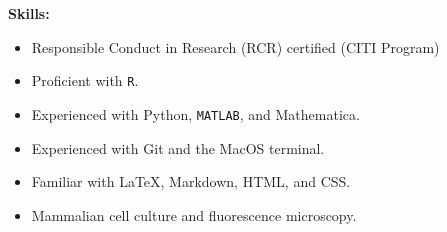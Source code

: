 \textbf{Skills:}

\begin{itemize}[noitemsep]
\item Responsible Conduct in Research (RCR) certified (CITI Program)
\item Proficient with \texttt{R}.
\item Experienced with Python, \texttt{MATLAB}, and Mathematica.
\item Experienced with Git and the MacOS terminal. 
\item Familiar with \LaTeX{}, Markdown, HTML, and CSS.
\item Mammalian cell culture and fluorescence microscopy. 
\end{itemize}